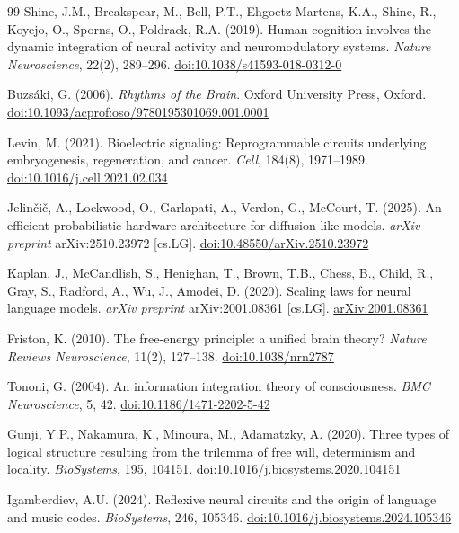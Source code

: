 \documentclass[12pt]{article}
\begin{document}
\begin{thebibliography}{99}
Shine, J.M., Breakspear, M., Bell, P.T., Ehgoetz Martens, K.A., Shine, R., Koyejo, O., Sporns, O., Poldrack, R.A. (2019). Human cognition involves the dynamic integration of neural activity and neuromodulatory systems. \textit{Nature Neuroscience}, 22(2), 289--296. \href{https://doi.org/10.1038/s41593-018-0312-0}{doi:10.1038/s41593-018-0312-0}

Buzsáki, G. (2006). \textit{Rhythms of the Brain}. Oxford University Press, Oxford. \href{https://doi.org/10.1093/acprof:oso/9780195301069.001.0001}{doi:10.1093/acprof:oso/9780195301069.001.0001}

Levin, M. (2021). Bioelectric signaling: Reprogrammable circuits underlying embryogenesis, regeneration, and cancer. \textit{Cell}, 184(8), 1971--1989. \href{https://doi.org/10.1016/j.cell.2021.02.034}{doi:10.1016/j.cell.2021.02.034}

Jelinčič, A., Lockwood, O., Garlapati, A., Verdon, G., McCourt, T. (2025). An efficient probabilistic hardware architecture for diffusion-like models. \textit{arXiv preprint} arXiv:2510.23972 [cs.LG]. \href{https://doi.org/10.48550/arXiv.2510.23972}{doi:10.48550/arXiv.2510.23972}

Kaplan, J., McCandlish, S., Henighan, T., Brown, T.B., Chess, B., Child, R., Gray, S., Radford, A., Wu, J., Amodei, D. (2020). Scaling laws for neural language models. \textit{arXiv preprint} arXiv:2001.08361 [cs.LG]. \href{https://arxiv.org/abs/2001.08361}{arXiv:2001.08361}

Friston, K. (2010). The free-energy principle: a unified brain theory? \textit{Nature Reviews Neuroscience}, 11(2), 127--138. \href{https://doi.org/10.1038/nrn2787}{doi:10.1038/nrn2787}

Tononi, G. (2004). An information integration theory of consciousness. \textit{BMC Neuroscience}, 5, 42. \href{https://doi.org/10.1186/1471-2202-5-42}{doi:10.1186/1471-2202-5-42}

Gunji, Y.P., Nakamura, K., Minoura, M., Adamatzky, A. (2020). Three types of logical structure resulting from the trilemma of free will, determinism and locality. \textit{BioSystems}, 195, 104151. \href{https://doi.org/10.1016/j.biosystems.2020.104151}{doi:10.1016/j.biosystems.2020.104151}

Igamberdiev, A.U. (2024). Reflexive neural circuits and the origin of language and music codes. \textit{BioSystems}, 246, 105346. \href{https://doi.org/10.1016/j.biosystems.2024.105346}{doi:10.1016/j.biosystems.2024.105346}


\end{thebibliography}
\end{document}
